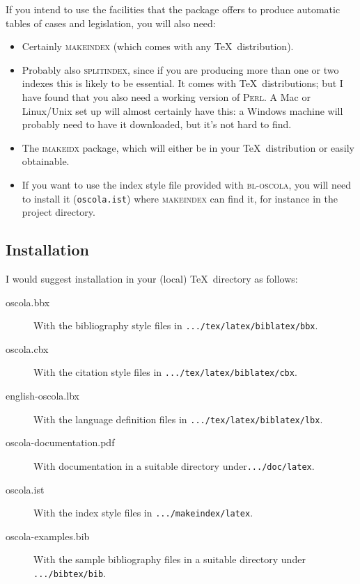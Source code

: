 \documentclass[a5paper,fontsize=9pt,DIV=1]{scrartcl}
\newcommand{\oscola}{\textsc{bl-oscola}}
\begin{document}
If you intend to use the facilities that the package offers to produce
automatic tables of cases and legislation, you will also need:
\begin{itemize}
\item Certainly \textsc{makeindex} (which comes with any \TeX\ distribution).
\item Probably also \textsc{splitindex}, since if you are producing
  more than one or two indexes this is likely to be essential. It
  comes with \TeX\ distributions; but I have found that you also need
  a working version of \textsc{Perl}. A Mac or Linux\slash Unix set up
  will almost certainly have this: a Windows machine will probably
  need to have it downloaded, but it's not hard to find.
\item The \textsc{imakeidx} package, which will either be in your
  \TeX\ distribution or easily obtainable.
\item If you want to use the index style file provided with \oscola,
  you will need to install it (\texttt{oscola.ist}) where
  \textsc{makeindex} can find it, for instance in the project
  directory.
\end{itemize}

\subsection{Installation}

I would suggest installation in your (local) \TeX\ directory as follows:
\begin{description}
\item[oscola.bbx] With the bibliography style files in \texttt{.../\allowbreak tex/\allowbreak latex/\linebreak biblatex/\allowbreak bbx}.
\item[oscola.cbx] With the citation style files in \texttt{.../tex/latex/\linebreak biblatex/cbx}.
\item[english-oscola.lbx] With the language definition files in \texttt{.../tex/latex/\linebreak biblatex/lbx}.
\item[oscola-documentation.pdf] With documentation in a suitable directory under\linebreak \texttt{.../doc/latex}.
\item[oscola.ist] With the index style files in \verb|.../makeindex/latex|.
\item[oscola-examples.bib] With the sample bibliography files in a suitable directory under \verb|.../bibtex/bib|.
\end{description}
\end{document}
